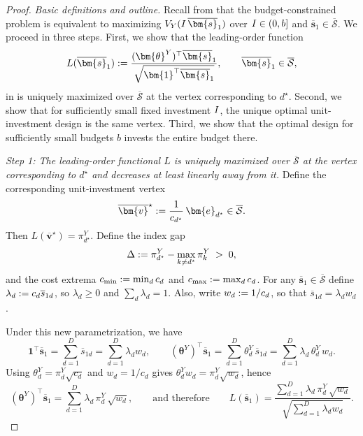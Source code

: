 \begin{proof}
  \emph{Basic definitions and outline.}
  Recall from  that the budget-constrained problem is equivalent to maximizing $V_Y(\invst\,\overline{\bm{s}}_1)$ over $I\in(0,b]$ and $\overline{\bm{s}}_1\in\overline{\mathcal{S}}$.
  We proceed in three steps.
  First, we show that the leading-order function
  \[
    L(\overline{\bm{s}}_1)\defeq
    \frac{(\bm{\theta}^Y)^\top
    \overline{\bm{s}}_1}{\sqrt{\bm{1}^\top\overline{\bm{s}}_1}},
    \qquad \overline{\bm{s}}_1\in\overline{\mathcal{S}},
  \]
  in  is uniquely maximized over $\overline{\mathcal{S}}$ at the vertex corresponding to $d^\star$.
  Second, we show that for sufficiently small fixed investment $I$, the unique optimal unit-investment design is the same vertex.
  Third, we show that the optimal design for sufficiently small budgets $b$ invests the entire budget there.

  \emph{Step 1: The leading-order functional $L$ is uniquely maximized over $\overline{\mathcal{S}}$ at the vertex corresponding to $d^\star$ and decreases at least linearly away from it.}
  Define the corresponding unit-investment vertex
  \[
    \overline{\bm{v}}^\star \defeq
    \frac{1}{c_{d^\star}}\,\bm{e}_{d^\star}\in\overline{\mathcal{S}}.
  \]
  Then $L(\overline{\bm{v}}^\star)=\pi_{d^\star}^Y$.
  Define the index gap
  \[
    \Delta:= \pi_{d^\star}^Y-\max_{k\neq d^\star}\pi_k^Y \;>\;0,
  \]
  and the cost extrema $c_{\min}:=\min_d c_{d}$ and $c_{\max}:=\max_d c_{d}$.
  For any $\overline{\bm{s}}_1\in\overline{\mathcal{S}}$ define $\lambda_d:= c_{d}\overline{s}_{1d}$, so $\lambda_d\ge0$ and $\sum_d\lambda_d=1$.
  Also, write $w_d:= 1/c_{d}$, so that $\overline{s}_{1d}=\lambda_d w_d$.

  Under this new parametrization, we have
  \[
    \bm{1}^\top\overline{\bm{s}}_1
    =
    \sum_{d=1}^D \overline{s}_{1d}
    =
    \sum_{d=1}^D \lambda_d w_d,
    \qquad
    (\bm{\theta}^Y)^\top\overline{\bm{s}}_1
    =
    \sum_{d=1}^D \theta_d^Y\,\overline{s}_{1d}
    =
    \sum_{d=1}^D \lambda_d\,\theta_d^Y\,w_d.
  \]
  Using $\theta_d^Y = \pi_d^Y\sqrt{c_{d}}$ and $w_d=1/c_{d}$ gives $\theta_d^Y w_d = \pi_d^Y\sqrt{w_d}$, hence
  \[
    (\bm{\theta}^Y)^\top\overline{\bm{s}}_1
    =
    \sum_{d=1}^D \lambda_d\,\pi_d^Y\,\sqrt{w_d},
    \qquad\text{and therefore}\qquad
    L(\overline{\bm{s}}_1)
    =
    \frac{\sum_{d=1}^D
    \lambda_d\,\pi_d^Y\,\sqrt{w_d}}{\sqrt{\sum_{d=1}^D \lambda_d w_d}}.
  \]


\end{proof}
